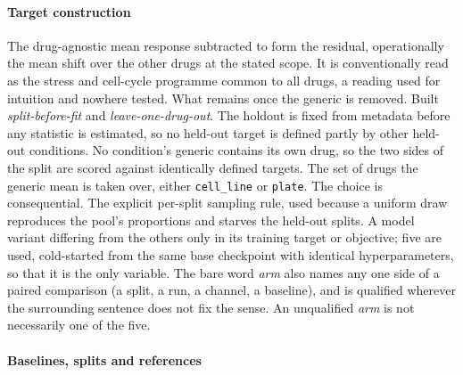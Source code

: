 \paragraph{Target construction}

\begin{description}[leftmargin=1em, itemsep=0.5ex,
                    font=\normalfont\bfseries]
 The drug-agnostic mean response subtracted to form
  the residual, operationally the mean shift over the other drugs at the stated
  scope. It is conventionally read as the stress and cell-cycle programme common
  to all drugs, a reading used for intuition and nowhere tested.
 What remains once the generic is removed.
  Built \emph{split-before-fit} and \emph{leave-one-drug-out}.
 The holdout is fixed from metadata before
  any statistic is estimated, so no held-out target is defined partly by other
  held-out conditions.
 No condition's generic contains its own drug,
  so the two sides of the split are scored against identically defined targets.
 The set of drugs the generic mean is taken over, either
  \texttt{cell\_line} or \texttt{plate}. The choice is consequential.
 The explicit per-split sampling rule, used because a
  uniform draw reproduces the pool's proportions and starves the held-out
  splits.
 A model variant differing from the others only in
  its training target or objective; five are used, cold-started from the same
  base checkpoint with identical hyperparameters, so that it is the only
  variable. The bare word \emph{arm} also names any one
  side of a paired comparison (a split, a run, a channel, a baseline), and is
  qualified wherever the surrounding sentence does not fix the sense. An
  unqualified \emph{arm} is not necessarily one of the five.
\end{description}

\paragraph{Baselines, splits and references}

